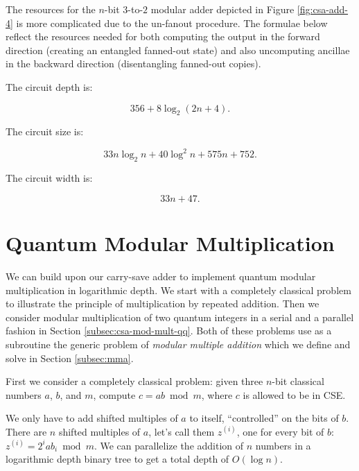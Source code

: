 The resources for the $n$-bit $3$-to-$2$ modular adder depicted in Figure
\ref{fig:csa-add-4} is more complicated due to the un-fanout procedure.
The formulae below reflect the resources needed for both computing the output
in the forward direction (creating an entangled fanned-out state)
and also uncomputing ancillae in the backward
direction (disentangling fanned-out copies).

The circuit depth is:

\begin{equation}
356 + 8\log_2(2n+4)\text{.}
\end{equation}

The circuit size is:

\begin{equation}
33n\log_2 n + 40\log^2 n + 575n + 752\text{.}
\end{equation}

The circuit width is:

\begin{equation}
33n + 47\text{.}
\end{equation}

%
\section{Quantum Modular Multiplication}
\label{sec:csa-mod-mult}

We can build upon our carry-save adder to implement quantum modular
multiplication in logarithmic depth. We start with a completely classical
problem to illustrate the principle of multiplication by repeated addition.
Then we consider modular multiplication of two quantum integers in a serial
and a parallel fashion in Section
\ref{subsec:csa-mod-mult-qq}. Both of these problems use as a subroutine the
generic problem of \emph{modular multiple addition} which we define and solve
in Section \ref{subsec:mma}.

First we consider a completely classical problem:
given three $n$-bit classical numbers $a$, $b$, and $m$,
compute $c = ab \bmod m$, where $c$ is allowed to be in CSE.

We only have to add shifted
multiples of $a$ to itself, ``controlled'' on the bits of $b$. There are
$n$ shifted multiples of $a$, let's call them $z^{(i)}$, one for every bit of $b$:
$z^{(i)} = 2^i a b_i \bmod m$.
We can parallelize the addition of $n$ numbers in a logarithmic depth
binary tree to get a total depth of $O(\log n)$.

